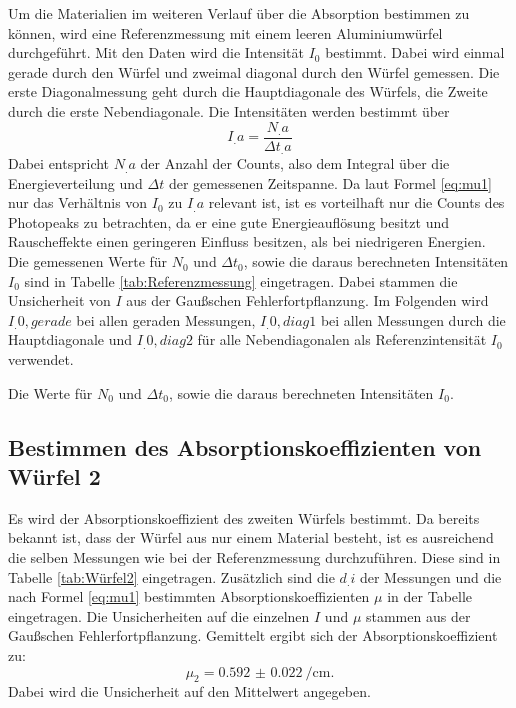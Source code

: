 Um die Materialien im weiteren Verlauf über die Absorption bestimmen zu können, wird eine Referenzmessung mit einem leeren Aluminiumwürfel durchgeführt. Mit den Daten wird die Intensität $I_0$ bestimmt. Dabei wird einmal gerade durch den Würfel und zweimal diagonal durch den Würfel gemessen. Die erste Diagonalmessung geht durch die Hauptdiagonale des Würfels, die Zweite durch die erste Nebendiagonale. Die Intensitäten werden bestimmt über
\begin{equation}
I_.a = \frac{N_.a}{\Delta t_.a}
\end{equation}
Dabei entspricht $N_.a$ der Anzahl der Counts, also dem Integral über die Energieverteilung und $\Delta t$ der gemessenen Zeitspanne. Da laut Formel \eqref{eq:mu1} nur das Verhältnis von $I_0$ zu $I_.a$ relevant ist, ist es vorteilhaft nur die Counts des Photopeaks zu betrachten, da er eine gute Energieauflösung besitzt und Rauscheffekte einen geringeren Einfluss besitzen, als bei niedrigeren Energien.\\
Die gemessenen Werte für $N_0$ und $\Delta t_0$, sowie die daraus berechneten Intensitäten $I_0$ sind in Tabelle \ref{tab:Referenzmessung} eingetragen.
Dabei stammen die Unsicherheit von $I$ aus der Gaußschen Fehlerfortpflanzung.
Im Folgenden wird $I_.{0,gerade}$ bei allen geraden Messungen, $I_.{0,diag1}$ bei allen Messungen durch die Hauptdiagonale und $I_.{0,diag2}$ für alle Nebendiagonalen als Referenzintensität $I_0$ verwendet.

\begin{table}
	\centering
	\caption{Die Werte für $N_0$ und $\Delta t_0$, sowie die daraus berechneten Intensitäten $I_0$.}
	
	\label{tab:Referenzmessung}
\end{table}

\subsection{Bestimmen des Absorptionskoeffizienten von Würfel 2}

Es wird der Absorptionskoeffizient des zweiten Würfels bestimmt. Da bereits bekannt ist, dass der Würfel aus nur einem Material besteht, ist es ausreichend die selben Messungen wie bei der Referenzmessung durchzuführen. Diese sind in Tabelle \ref{tab:Würfel2} eingetragen. Zusätzlich sind die $d_.i$ der Messungen und die nach Formel \ref{eq:mu1} bestimmten Absorptionskoeffizienten $\mu$ in der Tabelle eingetragen. Die Unsicherheiten auf die einzelnen $I$ und $\mu$ stammen aus der Gaußschen Fehlerfortpflanzung.
Gemittelt ergibt sich der Absorptionskoeffizient zu:
\[
\mu_2 = \SI{0.592(22)}{\per\centi\metre}\text{.}
\]
Dabei wird die Unsicherheit auf den Mittelwert angegeben.

